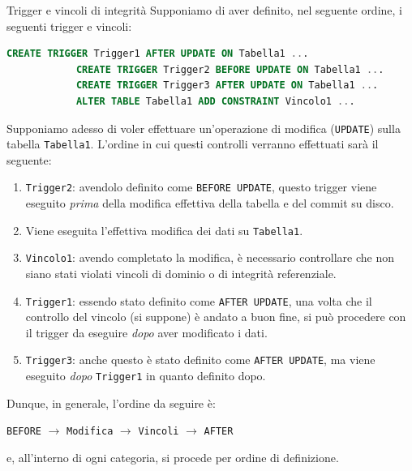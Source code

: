 \documentclass[12pt]{report}
\newcommand{\ra}{
	\rightarrow
}
\begin{document}
	\begin{osservazione}{Trigger e vincoli di integrità}{}
		Supponiamo di aver definito, nel seguente ordine, i seguenti trigger e vincoli:
		\begin{lstlisting}[language=SQL]
			CREATE TRIGGER Trigger1 AFTER UPDATE ON Tabella1 ...
			CREATE TRIGGER Trigger2 BEFORE UPDATE ON Tabella1 ...
			CREATE TRIGGER Trigger3 AFTER UPDATE ON Tabella1 ...
			ALTER TABLE Tabella1 ADD CONSTRAINT Vincolo1 ...
		\end{lstlisting}
		Supponiamo adesso di voler effettuare un'operazione di modifica (\texttt{UPDATE}) sulla tabella \texttt{Tabella1}. L'ordine in cui questi controlli verranno effettuati sarà il seguente:
		\begin{enumerate}
			\item \texttt{Trigger2}: avendolo definito come \texttt{BEFORE UPDATE}, questo trigger viene eseguito \textit{prima} della modifica effettiva della tabella e del commit su disco.
			
			\item Viene eseguita l'effettiva modifica dei dati su \texttt{Tabella1}.
			
			\item \texttt{Vincolo1}: avendo completato la modifica, è necessario controllare che non siano stati violati vincoli di dominio o di integrità referenziale.
			
			\item \texttt{Trigger1}: essendo stato definito come \texttt{AFTER UPDATE}, una volta che il controllo del vincolo (si suppone) è andato a buon fine, si può procedere con il trigger da eseguire \textit{dopo} aver modificato i dati.
			
			\item \texttt{Trigger3}: anche questo è stato definito come \texttt{AFTER UPDATE}, ma viene eseguito \textit{dopo} \texttt{Trigger1} in quanto definito dopo.
		\end{enumerate}
		Dunque, in generale, l'ordine da seguire è:
		\begin{center}
			\texttt{BEFORE} $\ra$ \texttt{Modifica} $\ra$ \texttt{Vincoli} $\ra$ \texttt{AFTER}
		\end{center}
		e, all'interno di ogni categoria, si procede per ordine di definizione.
	\end{osservazione}
	
\end{document}
